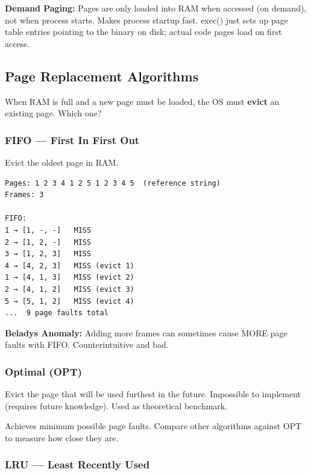 \documentclass[11pt]{article}
\begin{document}
\textbf{Demand Paging:} Pages are only loaded into RAM when accessed (on demand), not when process starts. Makes process startup fast. exec() just sets up page table entries pointing to the binary on disk; actual code pages load on first access.

\subsection{Page Replacement Algorithms}\label{page-replacement-algorithms}

When RAM is full and a new page must be loaded, the OS must \textbf{evict} an existing page. Which one?

\subsubsection{FIFO --- First In First Out}\label{fifo--first-in-first-out}

Evict the oldest page in RAM.

\setcodelang{}

\begin{verbatim}
Pages: 1 2 3 4 1 2 5 1 2 3 4 5  (reference string)
Frames: 3

FIFO:
1 → [1, -, -]   MISS
2 → [1, 2, -]   MISS
3 → [1, 2, 3]   MISS
4 → [4, 2, 3]   MISS (evict 1)
1 → [4, 1, 3]   MISS (evict 2)
2 → [4, 1, 2]   MISS (evict 3)
5 → [5, 1, 2]   MISS (evict 4)
...  9 page faults total
\end{verbatim}

\textbf{Belady\textquotesingle s Anomaly:} Adding more frames can sometimes cause MORE page faults with FIFO. Counterintuitive and bad.

\subsubsection{Optimal (OPT)}\label{optimal-opt}

Evict the page that will be used furthest in the future. Impossible to implement (requires future knowledge). Used as theoretical benchmark.

Achieves minimum possible page faults. Compare other algorithms against OPT to measure how close they are.

\subsubsection{LRU --- Least Recently Used}\label{lru--least-recently-used}
\end{document}
